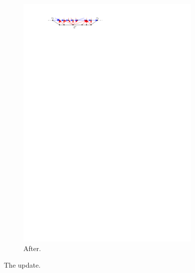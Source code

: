 \begin{figure}
\begin{subfigure}[b]{0.45 \textwidth}
          \includegraphics[width =\textwidth]{unifiedAlgo/img/sweep/updateAfter.pdf}
          \caption{After.}
      \end{subfigure}
      	\caption{The update.}
  \label{fig:sweep:update}
  \end{figure}


